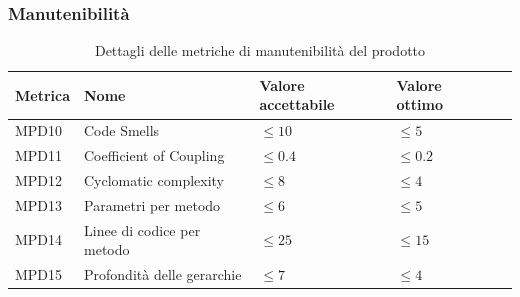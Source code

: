 \documentclass[a4paper,12pt]{article}
\begin{document}
{{        \subsubsection{Manutenibilità}
        \leavevmode
                \begin{table}[H]
                \centering
                    \begin{tabular}{|l|l|l|l|l|}
                        \hline
                        \rowcolor{gold}
                        \textbf{Metrica} & \textbf{Nome} & \textbf{Valore accettabile} & \textbf{Valore ottimo} \\
                        \hline
                        MPD10 & Code Smells  & $\le 10$ & $\le 5$ \\
                        \hline
                        MPD11 & Coefficient of Coupling & $\le 0.4$ & $\le 0.2$ \\
                        \hline
                        MPD12 & Cyclomatic complexity & $\le 8$ & $\le 4$ \\
                        \hline
                        MPD13 & Parametri per metodo & $\le 6$ & $\le 5$ \\
                        \hline
                        MPD14 & Linee di codice per metodo & $\le 25$ & $\le 15$ \\
                        \hline
                        MPD15 & Profondità delle gerarchie & $\le 7$ & $\le 4$ \\
                        \hline
                    \end{tabular}
                    \caption{Dettagli delle metriche di manutenibilità del prodotto}
                    \label{tab:metriche-manutenibilità}
                \end{table}
    }
}

\newpage
\end{document}
